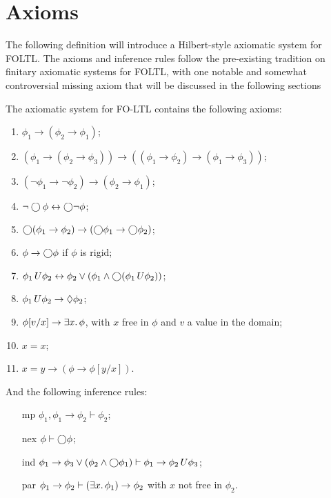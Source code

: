 \section{Axioms}
The following definition will introduce a Hilbert-style axiomatic system for \ac{FOLTL}. The axioms and inference rules
follow the pre-existing tradition on finitary axiomatic systems for \ac{FOLTL}, with one notable and somewhat
controversial missing axiom that will be discussed in the following sections

\begin{definition}\label{def:axioms}
  The axiomatic system for FO-LTL contains the following axioms:
  \begin{enumerate}
    \item $\phi_1 \to (\phi_2 \to \phi_1)$;
    \item $(\phi_1 \to (\phi_2 \to \phi_3)) \to ((\phi_1 \to \phi_2) \to (\phi_1 \to \phi_3))$;
    \item $(\neg\phi_1 \to \neg\phi_2) \to (\phi_2 \to \phi_1)$;
    \item $\neg\bigcirc{\phi} \leftrightarrow \bigcirc{\neg\phi}$;
    \item $\bigcirc{(\phi_1 \to \phi_2)} \to (\bigcirc{\phi_1} \to \bigcirc{\phi_2})$;
    \item $\phi \to \bigcirc{\phi}$ if $\phi$ is rigid;
    \item ${\phi_1}\,U {\phi_2} \leftrightarrow \phi_2 \lor (\phi_1 \land \bigcirc{({\phi_1}\,U {\phi_2})})$;
    \item ${\phi_1}\,U {\phi_2} \to \Diamond{\phi_2}$;
    \item $\phi[v/x] \to \exists {x} \ldotp {\phi}$, with $x$ free in $\phi$ and $v$ a value in the domain;
    \item $x = x$;
    \item $x = y \to (\phi \to \phi[y/x])$.
  \end{enumerate}
  And the following inference rules:
  \begin{enumerate}
    \item[mp] $\phi_1, \phi_1 \to \phi_2 \vdash \phi_2$;
    \item[nex] $\phi \vdash \bigcirc{\phi}$;
    \item[ind] $\phi_1 \to \phi_3 \lor (\phi_2 \land \bigcirc{\phi_1}) \vdash \phi_1 \to {\phi_2}\,U {\phi_3}$;
    \item[par] $\phi_1 \to \phi_2 \vdash (\exists {x} \ldotp {\phi_1}) \to \phi_2$ with $x$ not free in $\phi_2$.
  \end{enumerate}
\end{definition}

